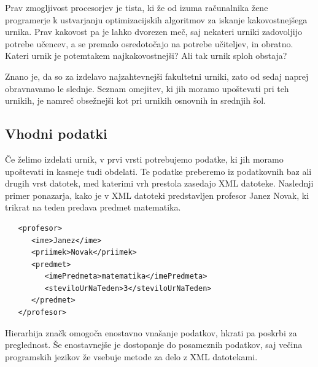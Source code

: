 \documentclass[a4paper,10pt]{article}
\begin{document}
Prav zmogljivost procesorjev je tista, ki že od izuma računalnika žene programerje k
ustvarjanju optimizacijskih algoritmov za iskanje kakovostnejšega urnika. Prav kakovost
pa je lahko dvorezen meč, saj nekateri urniki zadovoljijo potrebe učencev, a se premalo
osredotočajo na potrebe učiteljev, in obratno. Kateri urnik je potemtakem najkakovostnejši?
Ali tak urnik sploh obstaja?

Znano je, da so za izdelavo najzahtevnejši fakultetni urniki, zato od sedaj naprej
obravnavamo le slednje. Seznam omejitev, ki jih moramo upoštevati pri teh urnikih,
je namreč obsežnejši kot pri urnikih osnovnih in srednjih šol.

\pagebreak
\subsection{Vhodni podatki}

Če želimo izdelati urnik, v prvi vrsti potrebujemo podatke, ki jih moramo upoštevati in
kasneje tudi obdelati. Te podatke preberemo iz podatkovnih baz ali drugih vrst datotek,
med katerimi vrh prestola zasedajo XML datoteke. Naslednji primer ponazarja, kako je v
XML datoteki predstavljen profesor Janez Novak, ki trikrat na teden predava predmet
matematika.



\begin{verbatim}
   <profesor>
      <ime>Janez</ime>
      <priimek>Novak</priimek>
      <predmet>
         <imePredmeta>matematika</imePredmeta>
         <steviloUrNaTeden>3</steviloUrNaTeden>
      </predmet>
   </profesor>
\end{verbatim}


\noindent
Hierarhija značk omogoča enostavno vnašanje podatkov, hkrati pa poskrbi za preglednost.
Še enostavnejše je dostopanje do posameznih podatkov, saj večina programskih jezikov že
vsebuje metode za delo z XML datotekami.
\end{document}

